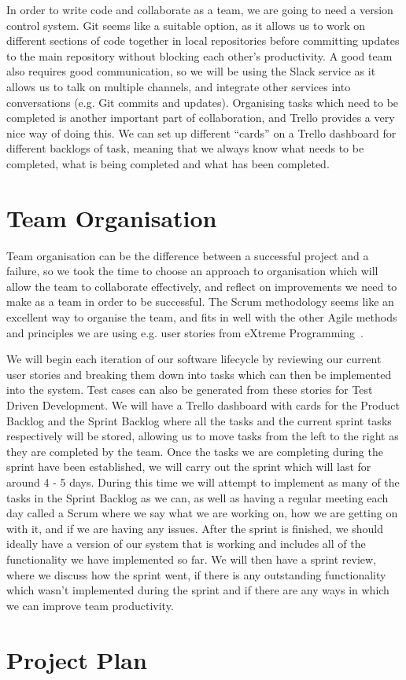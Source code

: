 In order to write code and collaborate as a team, we are going to need a version control system.
Git seems like a suitable option, as it allows us to work on different sections of code together in local repositories before committing updates to the main repository without blocking each other's productivity.
A good team also requires good communication, so we will be using the Slack service as it allows us to talk on multiple channels, and integrate other services into conversations (e.g. Git commits and updates).
Organising tasks which need to be completed is another important part of collaboration, and Trello provides a very nice way of doing this.
We can set up different “cards” on a Trello dashboard for different backlogs of task, meaning that we always know what needs to be completed, what is being completed and what has been completed.

\section{Team Organisation}

Team organisation can be the difference between a successful project and a failure, so we took the time to choose an approach to organisation which will allow the team to collaborate effectively, and reflect on improvements we need to make as a team in order to be successful.
The Scrum methodology seems like an excellent way to organise the team, and fits in well with the other Agile methods and principles we are using e.g. user stories from eXtreme Programming~\cite{sommerville2016software}.

We will begin each iteration of our software lifecycle by reviewing our current user stories and breaking them down into tasks which can then be implemented into the system.
Test cases can also be generated from these stories for Test Driven Development.
We will have a Trello dashboard with cards for the Product Backlog and the Sprint Backlog where all the tasks and the current sprint tasks respectively will be stored, allowing us to move tasks from the left to the right as they are completed by the team.
Once the tasks we are completing during the sprint have been established, we will carry out the sprint which will last for around 4 - 5 days.
During this time we will attempt to implement as many of the tasks in the Sprint Backlog as we can, as well as having a regular meeting each day called a Scrum where we say what we are working on, how we are getting on with it, and if we are having any issues.
After the sprint is finished, we should ideally have a version of our system that is working and includes all of the functionality we have implemented so far.
We will then have a sprint review, where we discuss how the sprint went, if there is any outstanding functionality which wasn't implemented during the sprint and if there are any ways in which we can improve team productivity. 

\section{Project Plan}





